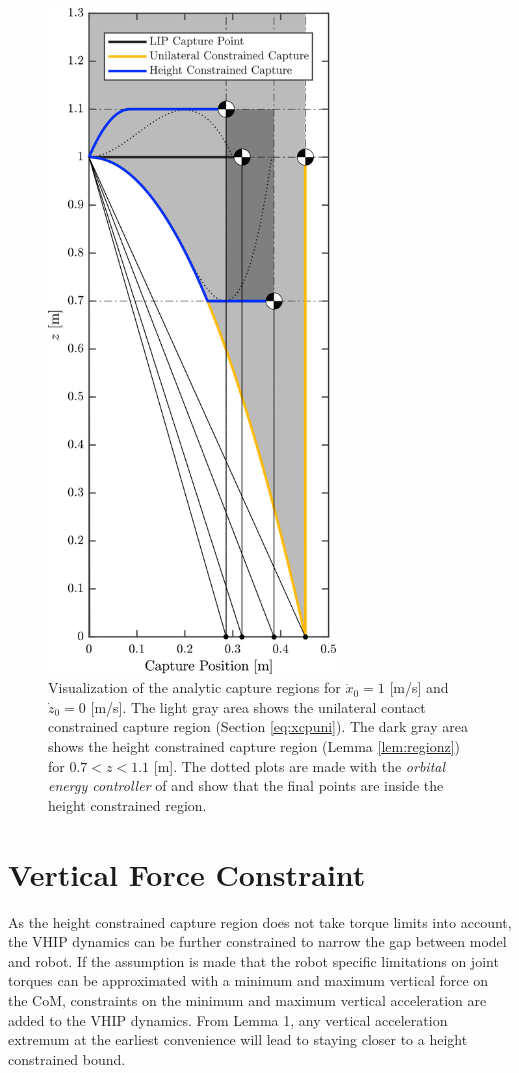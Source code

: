 \begin{figure}
      \centering
      \includegraphics[width=3in]{STYLESTUFF/CPLimitsDark.png}
      \caption{Visualization of the analytic capture regions for $\dot{x}_0=1$ [m/s] and $\dot{z}_0=0$ [m/s]. The light gray area shows the unilateral contact constrained capture region (Section \ref{eq:xcpuni}). The dark gray area shows the height constrained capture region (Lemma \ref{lem:regionz})  for $0.7<z<1.1$ [m]. The dotted plots are made with the \textit{orbital energy controller} of \cite{koolen2016balance} and show that the final points are inside the height constrained region.}
      \label{fig:capregion}
\end{figure}

\section{Vertical Force Constraint}\label{sec:verticalforce}
As the height constrained capture region does not take torque limits into account, the \ac{VHIP} dynamics can be further constrained to narrow the gap between model and robot. If the assumption is made that the robot specific limitations on joint torques can be approximated with a minimum and maximum vertical force on the \ac{CoM}, constraints on the minimum and maximum vertical acceleration are added to the \ac{VHIP} dynamics. From Lemma 1, any vertical acceleration extremum at the earliest convenience will lead to staying closer to a height constrained bound. 
     
